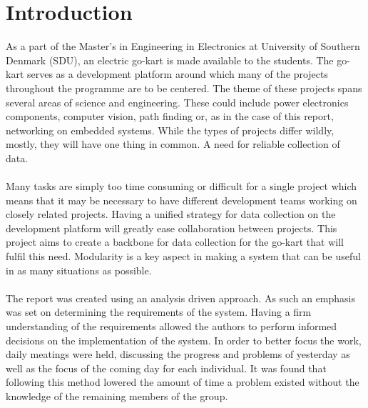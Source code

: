 \section{Introduction} %
\label{sec:introduction}
As a part of the Master's in Engineering in Electronics at University of Southern Denmark (SDU), an electric go-kart is made available to the students.
The go-kart serves as a development platform around which many of the projects throughout the programme are to be centered.
The theme of these projects spans several areas of science and engineering.
These could include power electronics components, computer vision, path finding or, as in the case of this report, networking on embedded systems.
While the types of projects differ wildly, mostly, they will have one thing in common.
A need for reliable collection of data.
\\~\\
Many tasks are simply too time consuming or difficult for a single project which means that it may be necessary to have different development teams working on closely related projects.
Having a unified strategy for data collection on the development platform will greatly ease collaboration between projects.
This project aims to create a backbone for data collection for the go-kart that will fulfil this need.
Modularity is a key aspect in making a system that can be useful in as many situations as possible.
\\~\\
The report was created using an analysis driven approach.
As such an emphasis was set on determining the requirements of the system.
Having a firm understanding of the requirements allowed the authors to perform informed decisions on the implementation of the system.
In order to better focus the work, daily meatings were held, discussing the progress and problems of yesterday as well as the focus of the coming day for each individual.
It was found that following this method lowered the amount of time a problem existed without the knowledge of the remaining members of the group. 
